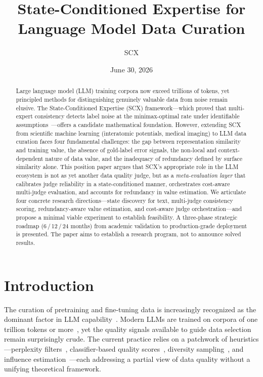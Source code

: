 \documentclass[11pt,twocolumn]{article}
\title{State-Conditioned Expertise for Language Model Data Curation}
\author{SCX}
\date{June 30, 2026}
\begin{document}
\maketitle

\begin{abstract}
Large language model (LLM) training corpora now exceed trillions of tokens, yet principled methods for distinguishing genuinely valuable data from noise remain elusive. The State-Conditioned Expertise (SCX) framework---which proved that multi-expert consistency detects label noise at the minimax-optimal rate under identifiable assumptions~\cite{scx2026}---offers a candidate mathematical foundation. However, extending SCX from scientific machine learning (interatomic potentials, medical imaging) to LLM data curation faces four fundamental challenges: the gap between representation similarity and training value, the absence of gold-label error signals, the non-local and context-dependent nature of data value, and the inadequacy of redundancy defined by surface similarity alone. This position paper argues that SCX's appropriate role in the LLM ecosystem is not as yet another data quality judge, but as a \textit{meta-evaluation layer} that calibrates judge reliability in a state-conditioned manner, orchestrates cost-aware multi-judge evaluation, and accounts for redundancy in value estimation. We articulate four concrete research directions---state discovery for text, multi-judge consistency scoring, redundancy-aware value estimation, and cost-aware judge orchestration---and propose a minimal viable experiment to establish feasibility. A three-phase strategic roadmap (6\,/\,12\,/\,24 months) from academic validation to production-grade deployment is presented. The paper aims to establish a research program, not to announce solved results.
\end{abstract}

\section{Introduction}

The curation of pretraining and fine-tuning data is increasingly recognized as the dominant factor in LLM capability~\cite{gunasekar2023textbooks,zhou2024web,Brown2020}. Modern LLMs are trained on corpora of one trillion tokens or more~\cite{raffel2020,gao2020pile}, yet the quality signals available to guide data selection remain surprisingly crude. The current practice relies on a patchwork of heuristics---perplexity filters~\cite{wenzek2020quality}, classifier-based quality scores~\cite{penedo2023refinedweb}, diversity sampling~\cite{xie2023dsir}, and influence estimation~\cite{pruthi2020estimating,koh2017influence}---each addressing a partial view of data quality without a unifying theoretical framework.
\end{document}
